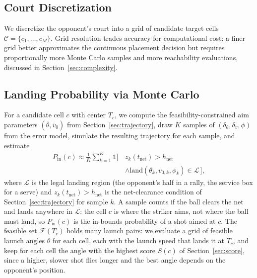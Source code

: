   \subsection{Court Discretization}\label{sec:discretization}

  We discretize the opponent's court into a grid of candidate target cells
  $\mathcal{C} = \{c_1, \dots, c_M\}$. Grid resolution trades accuracy for
  computational cost: a finer grid better approximates the continuous placement
  decision but requires proportionally more Monte Carlo samples and more
  reachability evaluations, discussed in Section~\ref{sec:complexity}.

  \subsection{Landing Probability via Monte Carlo}\label{sec:landing}

  For a candidate cell $c$ with center $T_c$, we compute the
  feasibility-constrained aim parameters $(\bar\theta, \bar v_0)$ from
  Section~\ref{sec:trajectory}, draw $K$ samples of $(\delta_\theta, \delta_v,
  \phi)$ from the error model, simulate the resulting trajectory for each
  sample, and estimate
  \begin{equation}
  \begin{aligned}
  P_{\mathrm{in}}(c) \approx \frac{1}{K} \sum_{k=1}^{K} \mathbb{1}[\,
  & z_k(t_{\mathrm{net}}) > h_{\mathrm{net}} \\
  & \wedge \mathrm{land}(\theta_k, v_{0,k}, \phi_k) \in \mathcal{L} \,] ,
  \end{aligned}
  \end{equation}
  where $\mathcal{L}$ is the legal landing region (the opponent's half in a
  rally, the service box for a serve) and $z_k(t_{\mathrm{net}}) >
  h_{\mathrm{net}}$ is the net-clearance condition of
  Section~\ref{sec:trajectory} for sample $k$. A sample counts if the ball
  clears the net and lands anywhere in $\mathcal{L}$: the cell $c$ is where the
  striker aims, not where the ball must land, so $P_{\mathrm{in}}(c)$ is the
  in-bounds probability of a shot aimed at $c$. The feasible set
  $\mathcal{F}(T_c)$ holds many launch pairs: we evaluate a grid of feasible
  launch angles $\bar\theta$ for each cell, each with the launch speed that
  lands it at $T_c$, and keep for each cell the angle with the highest score
  $S(c)$ of Section~\ref{sec:score}, since a higher, slower shot flies longer
  and the best angle depends on the opponent's position.

